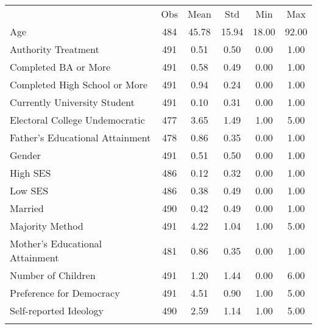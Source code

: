 \begin{center}
\begin{tabular}{lccccc}
\hline \noalign{\smallskip} & Obs & Mean & Std & Min & Max\\
\noalign{\smallskip}\hline \noalign{\smallskip}Age & 484 & 45.78 & 15.94 & 18.00 & 92.00\\
Authority Treatment & 491 & 0.51 & 0.50 & 0.00 & 1.00\\
Completed BA or More & 491 & 0.58 & 0.49 & 0.00 & 1.00\\
Completed High School or More & 491 & 0.94 & 0.24 & 0.00 & 1.00\\
Currently University Student & 491 & 0.10 & 0.31 & 0.00 & 1.00\\
Electoral College Undemocratic & 477 & 3.65 & 1.49 & 1.00 & 5.00\\
Father’s Educational Attainment & 478 & 0.86 & 0.35 & 0.00 & 1.00\\
Gender & 491 & 0.51 & 0.50 & 0.00 & 1.00\\
High SES & 486 & 0.12 & 0.32 & 0.00 & 1.00\\
Low SES & 486 & 0.38 & 0.49 & 0.00 & 1.00\\
Married & 490 & 0.42 & 0.49 & 0.00 & 1.00\\
Majority Method & 491 & 4.22 & 1.04 & 1.00 & 5.00\\
Mother’s Educational Attainment & 481 & 0.86 & 0.35 & 0.00 & 1.00\\
Number of Children & 491 & 1.20 & 1.44 & 0.00 & 6.00\\
Preference for Democracy & 491 & 4.51 & 0.90 & 1.00 & 5.00\\
Self-reported Ideology & 490 & 2.59 & 1.14 & 1.00 & 5.00\\
\noalign{\smallskip}\hline\end{tabular}\\
\end{center}
